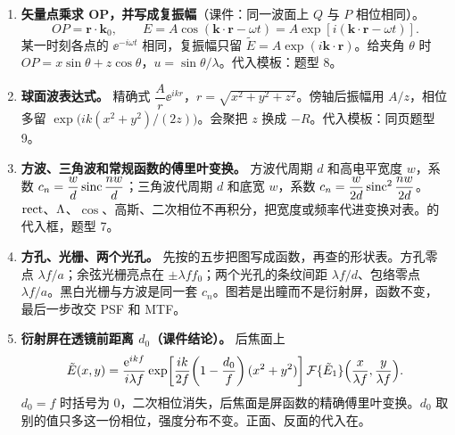 \begin{tcolorbox}[fmlstyle,title={先看这五条}]
\begin{enumerate}
\item \textbf{矢量点乘求 OP，并写成复振幅}（课件：同一波面上 $Q$ 与 $P$ 相位相同）。
\[
OP=\bm r\cdot\bm k_0,\qquad
E=A\cos(\bm k\cdot\bm r-\omega t)
=A\exp[i(\bm k\cdot\bm r-\omega t)].
\]
某一时刻各点的 $\ee^{-i\omega t}$ 相同，复振幅只留 $\tilde E=A\exp(i\bm k\cdot\bm r)$。给夹角 $\theta$ 时 $OP=x\sin\theta+z\cos\theta$，$u=\sin\theta/\lambda$。代入模板：\pageref{sec:opwave}题型 8。

\item \textbf{球面波表达式。} 精确式 $\dfrac{A}{r}\ee^{ikr}$，$r=\sqrt{x^2+y^2+z^2}$。傍轴后振幅用 $A/z$，相位多留 $\exp\!\big(ik(x^2+y^2)/(2z)\big)$。会聚把 $z$ 换成 $-R$。代入模板：同页题型 9。

\item \textbf{方波、三角波和常规函数的傅里叶变换。} 方波代周期 $d$ 和高电平宽度 $w$，系数 $c_n=\dfrac{w}{d}\operatorname{sinc}\dfrac{nw}{d}$；三角波代周期 $d$ 和底宽 $w$，系数 $c_n=\dfrac{w}{2d}\operatorname{sinc}^2\dfrac{nw}{2d}$。$\operatorname{rect}$、$\Lambda$、$\cos$、高斯、二次相位不再积分，把宽度或频率代进变换对表。\pageref{sec:pairs}的代入框，题型 7。

\item \textbf{方孔、光栅、两个光孔。} 先按\pageref{rcp:readfig}的五步把图写成函数，再查\pageref{fml:shapes}的形状表。方孔零点 $\lambda f/a$；余弦光栅亮点在 $\pm\lambda ff_0$；两个光孔的条纹间距 $\lambda f/d$、包络零点 $\lambda f/a$。黑白光栅与方波是同一套 $c_n$。图若是出瞳而不是衍射屏，函数不变，最后一步改交 PSF 和 MTF。

\item \textbf{衍射屏在透镜前距离 $d_0$（课件结论）。} 后焦面上
\[
\tilde E(x,y)=\frac{\mathrm{e}^{ikf}}{i\lambda f}
\exp\!\left[\frac{ik}{2f}\!\left(1-\frac{d_0}{f}\right)(x^2+y^2)\right]
\mathcal{F}\{\tilde E_1\}\Big(\frac{x}{\lambda f},\frac{y}{\lambda f}\Big).
\]
$d_0=f$ 时括号为 0，二次相位消失，后焦面是屏函数的精确傅里叶变换。$d_0$ 取别的值只多这一份相位，强度分布不变。正面、反面的代入在\pageref{ex:screenpos}。
\end{enumerate}
\end{tcolorbox}

\clearpage

